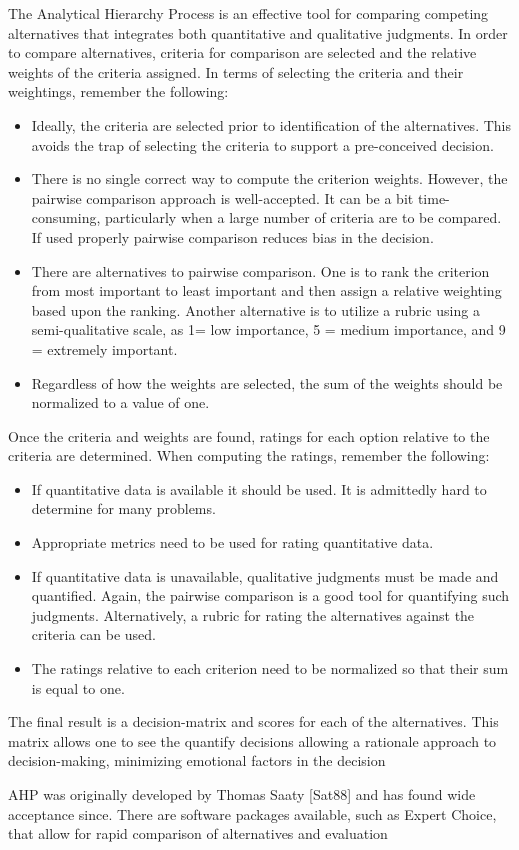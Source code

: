 The Analytical Hierarchy Process is an effective tool for comparing
competing alternatives that integrates both quantitative and qualitative
judgments. In order to compare alternatives, criteria for comparison are
selected and the relative weights of the criteria assigned. In terms of
selecting the criteria and their weightings, remember the following:

\begin{itemize}
\item
  Ideally, the criteria are selected prior to identification of the
  alternatives. This avoids the trap of selecting the criteria to
  support a pre-conceived decision.
\item
  There is no single correct way to compute the criterion weights.
  However, the pairwise comparison approach is well-accepted. It can be
  a bit time-consuming, particularly when a large number of criteria are
  to be compared. If used properly pairwise comparison reduces bias in
  the decision.
\item
  There are alternatives to pairwise comparison. One is to rank the
  criterion from most important to least important and then assign a
  relative weighting based upon the ranking. Another alternative is to
  utilize a rubric using a semi-qualitative scale, as 1= low importance,
  5 = medium importance, and 9 = extremely important.
\item
  Regardless of how the weights are selected, the sum of the weights
  should be normalized to a value of one.
\end{itemize}

Once the criteria and weights are found, ratings for each option
relative to the criteria are determined. When computing the ratings,
remember the following:

\begin{itemize}
\item
  If quantitative data is available it should be used. It is admittedly
  hard to determine for many problems.
\item
  Appropriate metrics need to be used for rating quantitative data.
\item
  If quantitative data is unavailable, qualitative judgments must be
  made and quantified. Again, the pairwise comparison is a good tool for
  quantifying such judgments. Alternatively, a rubric for rating the
  alternatives against the criteria can be used.
\item
  The ratings relative to each criterion need to be normalized so that
  their sum is equal to one.
\end{itemize}

The final result is a decision-matrix and scores for each of the
alternatives. This matrix allows one to see the quantify decisions
allowing a rationale approach to decision-making, minimizing emotional
factors in the decision

AHP was originally developed by Thomas Saaty {[}Sat88{]} and has found
wide acceptance since. There are software packages available, such as
Expert Choice, that allow for rapid comparison of alternatives and
evaluation
